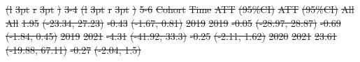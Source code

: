 \documentclass[
  letterpaper,
  DIV=11,
  numbers=noendperiod]{scrartcl}
\makeatletter
\renewenvironment{table}%
   {\renewcommand\familydefault\sfdefault
    \@float{table}}
   {\end@float}
\providecommand{\DIFdel}[1]{{\protect\color{red}\sout{#1}}}                      %
\providecommand{\DIFdelFL}[1]{\DIFdel{#1}} %
\providecommand{\DIFaddbeginFL}{} %
\providecommand{\DIFaddendFL}{} %
\providecommand{\DIFdelbeginFL}{} %
\providecommand{\DIFdelendFL}{} %
\newcommand{\DIFscaledelfig}{0.5}
\newlength{\DIFdelgraphicswidth} %
\newlength{\DIFdelgraphicsheight} %
\newcommand{\DIFaddincludegraphics}[2][]{{\color{blue}\fbox{\DIFOincludegraphics[#1]{#2}}}} %
\newcommand{\DIFdelincludegraphics}[2][]{%
\sbox{\DIFdelgraphicsbox}{\DIFOincludegraphics[#1]{#2}}%
\settoboxwidth{\DIFdelgraphicswidth}{\DIFdelgraphicsbox} %
\settoboxtotalheight{\DIFdelgraphicsheight}{\DIFdelgraphicsbox} %
\scalebox{\DIFscaledelfig}{%
\parbox[b]{\DIFdelgraphicswidth}{\usebox{\DIFdelgraphicsbox}\\[-\baselineskip] \rule{\DIFdelgraphicswidth}{0em}}\llap{\resizebox{\DIFdelgraphicswidth}{\DIFdelgraphicsheight}{%
\setlength{\unitlength}{\DIFdelgraphicswidth}%
\begin{picture}(1,1)%
\thicklines\linethickness{2pt} %
{\color[rgb]{1,0,0}\put(0,0){\framebox(1,1){}}}%
{\color[rgb]{1,0,0}\put(0,0){\line( 1,1){1}}}%
{\color[rgb]{1,0,0}\put(0,1){\line(1,-1){1}}}%
\end{picture}%
}\hspace*{3pt}}} %
} %
\DeclareRobustCommand{\DIFaddbeginFL}{\DIFOaddbeginFL \let\includegraphics\DIFaddincludegraphics} %
\DeclareRobustCommand{\DIFaddendFL}{\DIFOaddendFL \let\includegraphics\DIFOincludegraphics} %
\DeclareRobustCommand{\DIFdelbeginFL}{\DIFOdelbeginFL \let\includegraphics\DIFdelincludegraphics} %
\DeclareRobustCommand{\DIFdelendFL}{\DIFOaddendFL \let\includegraphics\DIFOincludegraphics} %
\makeatother
\begin{document}
\DIFdelendFL \DIFaddbeginFL \begin{table}
\DIFaddendFL 

\DIFdelbeginFL %
\DIFdelFL{(l}%
\DIFdelFL{3pt}%
\DIFdelFL{r}%
\DIFdelFL{3pt}%
\DIFdelFL{)}%
\DIFdelFL{3-4}%
\DIFdelFL{(l}%
\DIFdelFL{3pt}%
\DIFdelFL{r}%
\DIFdelFL{3pt}%
\DIFdelFL{)}%
\DIFdelFL{5-6}%
\DIFdelFL{Cohort }%
\DIFdelFL{Time }%
\DIFdelFL{ATT }%
\DIFdelFL{(95\%CI) }%
\DIFdelFL{ATT }%
\DIFdelFL{(95\%CI)}%
\DIFdelFL{All }%
\DIFdelFL{All }%
\DIFdelFL{1.95 }%
\DIFdelFL{(-23.34, 27.23) }%
\DIFdelFL{-0.43 }%
\DIFdelFL{(-1.67, 0.81)}%
\DIFdelFL{2019 }%
\DIFdelFL{2019 }%
\DIFdelFL{-0.05 }%
\DIFdelFL{(-28.97, 28.87) }%
\DIFdelFL{-0.69 }%
\DIFdelFL{(-1.84, 0.45)}%
\DIFdelFL{2019 }%
\DIFdelFL{2021 }%
\DIFdelFL{-4.31 }%
\DIFdelFL{(-41.92, 33.3) }%
\DIFdelFL{-0.25 }%
\DIFdelFL{(-2.11, 1.62)}%
\DIFdelFL{2020 }%
\DIFdelFL{2021 }%
\DIFdelFL{23.61 }%
\DIFdelFL{(-19.88, 67.11) }%
\DIFdelFL{-0.27 }%
\DIFdelFL{(-2.04, 1.5)}%

\end{table}
\end{document}
